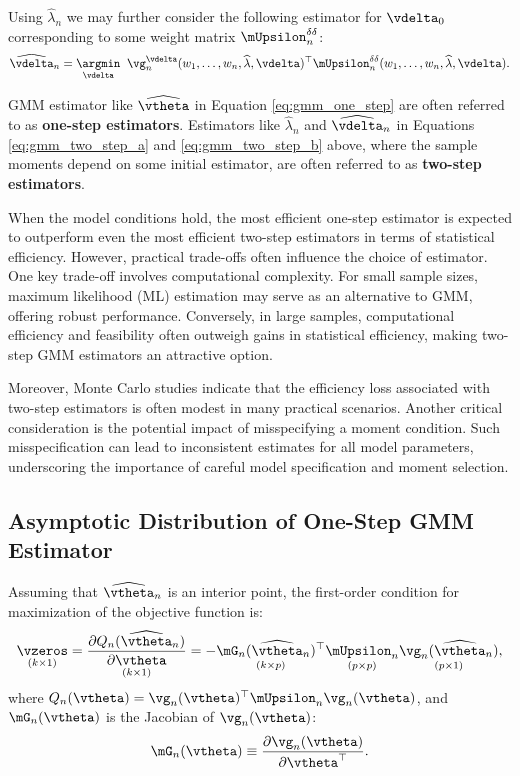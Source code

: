 \documentclass[english,12pt]{book}\usepackage[]{graphicx}\usepackage[]{xcolor}
\begin{document}
Using $\widehat{\lambda}_n$ we may further consider the following estimator for $\vdelta_0$ corresponding to some weight matrix $\mUpsilon^{\delta\delta}_n$:
\begin{equation}\label{eq:gmm_two_step_b}
\widehat{\vdelta}_n = \underset{\vdelta}{\argmin}\;\;\vg_n^{\vdelta}(w_1,\ldots,w_n, \widehat{\lambda}, \vdelta)^\top\mUpsilon^{\delta\delta}_n(w_1,\ldots,w_n, \widehat{\lambda}, \vdelta).
\end{equation}

GMM estimator like $\widehat{\vtheta}$ in Equation \eqref{eq:gmm_one_step} are often referred to as \textbf{one-step estimators}. Estimators like $\widehat{\lambda}_n$ and $\widehat{\vdelta}_n$ in Equations \eqref{eq:gmm_two_step_a} and \eqref{eq:gmm_two_step_b} above, where the sample moments depend on some initial estimator, are often referred to as \textbf{two-step estimators}.

When the model conditions hold, the most efficient one-step estimator is expected to outperform even the most efficient two-step estimators in terms of statistical efficiency. However, practical trade-offs often influence the choice of estimator. One key trade-off involves computational complexity. For small sample sizes, maximum likelihood (ML) estimation may serve as an alternative to GMM, offering robust performance. Conversely, in large samples, computational efficiency and feasibility often outweigh gains in statistical efficiency, making two-step GMM estimators an attractive option.

Moreover, Monte Carlo studies indicate that the efficiency loss associated with two-step estimators is often modest in many practical scenarios. Another critical consideration is the potential impact of misspecifying a moment condition. Such misspecification can lead to inconsistent estimates for all model parameters, underscoring the importance of careful model specification and moment selection.

\subsection{Asymptotic Distribution of One-Step GMM Estimator}\label{sec:gmm-one-step}

Assuming that $\widehat{\vtheta}_n$ is an interior point, the first-order condition for maximization of the objective function is:
\begin{equation}\label{eq:foc_review}
  \underset{(k\times 1)}{\vzeros} = \underset{(k\times 1)}{\frac{\partial Q_n(\widehat{\vtheta}_n)}{\partial \vtheta}} = - \underset{(k\times p)}{\mG_n(\widehat{\vtheta}_n)^\top}\underset{(p\times p)}{\mUpsilon_n}\underset{(p\times 1)}{\vg_n(\widehat{\vtheta}_n)},
\end{equation}
%
where $Q_n(\vtheta) = \vg_n(\vtheta)^\top\mUpsilon_n\vg_n(\vtheta)$, and $\mG_n(\vtheta)$ is the Jacobian of $\vg_n(\vtheta)$:
\begin{equation*}
  \mG_n(\vtheta) \equiv  \frac{\partial \vg_n(\vtheta)}{\partial \vtheta^\top}.
\end{equation*}
\end{document}
